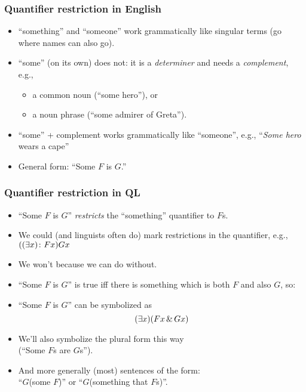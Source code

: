 \begin{frame}
\frametitle{Quantifier restriction in English}

\begin{itemize}[<+->]
  \item ``something'' and ``someone'' work grammatically like singular
  terms (go where names can also go).
  \item ``some'' (on its own) does not: it is a \emph{determiner} and
  needs a \emph{complement}, e.g.,
  \begin{itemize}
    \item a common noun (``some hero''), or
    \item a noun phrase (``some admirer of Greta'').
  \end{itemize}
  \item ``some'' + complement works grammatically like ``someone'',
  e.g., ``\emph{Some hero} wears a cape''
  \item General form: ``Some $F$ is $G$.''
\end{itemize}
\end{frame}

\begin{frame}
\frametitle{Quantifier restriction in QL}

\begin{itemize}[<+->]
  \item ``Some $F$ is $G$'' \emph{restricts} the ``something''
  quantifier to $F$s.
  \item We could (and linguists often do) mark restrictions in the
  quantifier, e.g., $((\exists x)\colon Fx) Gx$
  \item We won't because we can do without.
  \item ``Some $F$ is $G$'' is true iff there is something which
  is both $F$ and also $G$, so:
  \item ``Some $F$ is $G$'' can be symbolized as
  \[ (\exists x)(Fx \,\&\, Gx) \]
  \item We'll also symbolize the plural form this way\\ (``Some $F$s are
  $G$s'').
  \item And more generally (most) sentences of the form:\\
  ``$G$(some $F$)'' or ``$G$(something that $F$s)''.
\end{itemize}
\end{frame}

